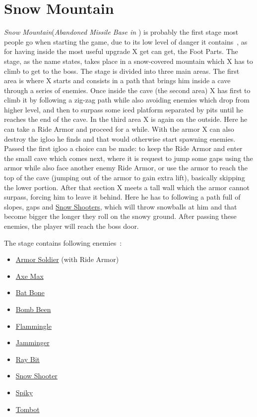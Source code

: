 \section{Snow Mountain}
\textit{Snow Mountain}(\textit{Abandoned Missile Base in \mhx}) is probably the first stage most people go when starting the game, due to its low level of danger it contains~\cite{stratwiki:Snow_mountain}, as for having inside the most useful upgrade X get can get, the Foot Parts. The stage, as the name states, takes place in a snow-covered mountain which X has to climb to get to the boss. The stage is divided into three main areas. The first area is where X starts and consists in a path that brings him inside a cave through a series of enemies. Once inside the cave (the second area) X has first to climb it by following a zig-zag path while also avoiding enemies which drop from higher level, and then to surpass some iced platform separated by pits until he reaches the end of the cave. In the third area X is again on the outside. Here he can take a Ride Armor and proceed for a while. With the armor X can also destroy the igloo he finds and that would otherwise start spawning enemies. Passed the first igloo a choice can be made: to keep the Ride Armor and enter the small cave which comes next, where it is request to jump some gaps using the armor while also face another enemy Ride Armor, or use the armor to reach the top of the cave (jumping out of the armor to gain extra lift), basically skipping the lower portion. After that section X meets a tall wall which the armor cannot surpass, forcing him to leave it behind. Here he has to following a path full of slopes, gaps and \hyperlink{enem:Snow_Shooter}{Snow Shooters}, which will throw snowballs at him and that become bigger the longer they roll on the snowy ground. After passing these enemies, the player will reach the boss door.

The stage contains following enemies~\cite{wiki:Snow_mountain}:
\begin{itemize}
	\item \hyperlink{enem:Armor_Soldier}{Armor Soldier} (with Ride Armor)
	\item \hyperlink{enem:Axe_Max}{Axe Max}
	\item \hyperlink{enem:Batton_Bone}{Bat Bone}
	\item \hyperlink{enem:Bomb_Been}{Bomb Been}
	\item \hyperlink{enem:Flammingle}{Flammingle}
	\item \hyperlink{enem:Jamminger}{Jamminger }
	\item \hyperlink{enem:Ray_Bit}{Ray Bit}
	\item \hyperlink{enem:Snow_Shooter}{Snow Shooter}
	\item \hyperlink{enem:Spiky}{Spiky}
	\item \hyperlink{enem:Tombot}{Tombot}
\end{itemize}

